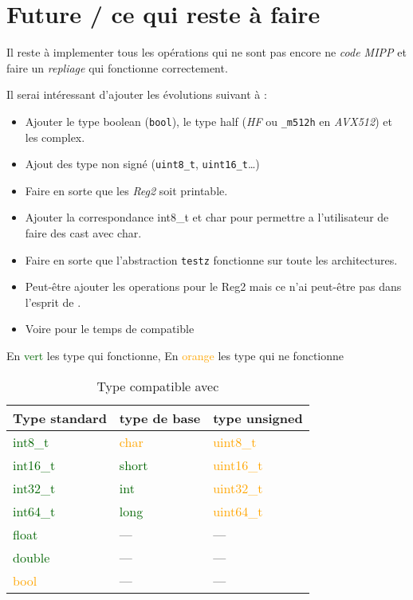 \section{Future / ce qui reste à faire}

Il reste à implementer tous les opérations qui ne sont pas encore ne \emph{code MIPP} et
faire un \textit{repliage} qui fonctionne correctement.

Il serai intéressant d'ajouter les évolutions suivant à \MIPP :

\begin{itemize}
  \item Ajouter le type boolean (\verb|bool|), le type half (\emph{HF} ou
  \verb|_m512h| en \emph{AVX512}) et les complex.
  \item Ajout des type non signé (\verb|uint8_t|, \verb|uint16_t|\dots)
  \item Faire en sorte que les \emph{Reg2} soit printable.
  \item Ajouter la correspondance int8_t et char pour permettre a l'utilisateur de faire
  des cast avec char.
  \item Faire en sorte que l'abstraction \verb|testz| fonctionne sur toute les architectures.
  \item Peut-être ajouter les operations pour le Reg2 mais ce n'ai peut-être pas dans
  l'esprit de \MIPP.
  \item Voire pour le temps de compatible
\end{itemize}

\begin{table}[H]
  \centering
  \caption*{En \textcolor{darkGreen}{vert} les type qui fonctionne, En \textcolor{orange}{orange}
    les type qui ne fonctionne}
  \begin{tabular}[H]{|l|l|l|}
    \hline
    \textbf{Type standard}          & \textbf{type de base}        & \textbf{type unsigned}        \\
    \hline
    \textcolor{darkGreen}{int8_t}  & \textcolor{orange}{char}     & \textcolor{orange}{uint8_t}  \\
    \hline
    \textcolor{darkGreen}{int16_t} & \textcolor{darkGreen}{short} & \textcolor{orange}{uint16_t} \\
    \hline
    \textcolor{darkGreen}{int32_t} & \textcolor{darkGreen}{int}   & \textcolor{orange}{uint32_t} \\
    \hline
    \textcolor{darkGreen}{int64_t} & \textcolor{darkGreen}{long}  & \textcolor{orange}{uint64_t} \\
    \hline
    \textcolor{darkGreen}{float}    & \----                        & \----                         \\
    \hline
    \textcolor{darkGreen}{double}   & \----                        & \----                         \\
    \hline
    \textcolor{orange}{bool}        & \----                        & \----                         \\
    \hline
  \end{tabular}
  \caption{Type compatible avec \MIPP}
\end{table}
